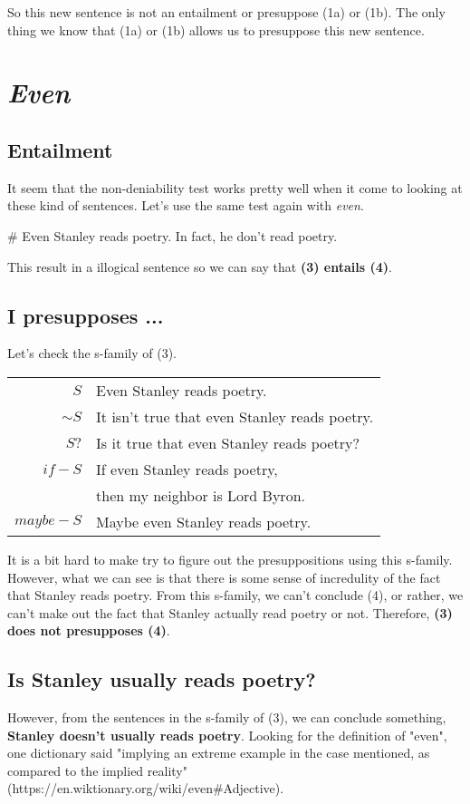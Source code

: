 \documentclass{article}
\begin{document}
So this new sentence is not an entailment or presuppose (1a) or (1b). The only thing we know that (1a) or (1b) allows us to presuppose this new sentence. 

\section{\textit{Even}}
\subsection{Entailment}
It seem that the non-deniability test works pretty well when it come to looking at these kind of sentences. Let's use the same test again with \textit{even}.

\# Even Stanley reads poetry. In fact, he don't read poetry. 

This result in a illogical sentence so we can say that \textbf{(3) entails (4)}. 

\subsection{I presupposes ...}
Let's check the s-family of (3). 

\begin{center}
\begin{tabular}{r|l}
    $S$         & Even Stanley reads poetry. \\
    $\sim S$    & It isn't true that even Stanley reads poetry. \\
    $S?$        & Is it true that even Stanley reads poetry? \\
    $if-S$      & If even Stanley reads poetry, \\
                & then my neighbor is Lord Byron. \\
    $maybe-S$   & Maybe even Stanley reads poetry. \\
\end{tabular}
\end{center}

It is a bit hard to make try to figure out the presuppositions using this s-family. However, what we can see is that there is some sense of incredulity of the fact that Stanley reads poetry. From this s-family, we can't conclude (4), or rather, we can't make out the fact that Stanley actually read poetry or not. Therefore, \textbf{(3) does not presupposes (4)}.

\subsection{Is Stanley usually reads poetry?}
However, from the sentences in the s-family of (3), we can conclude something, \textbf{Stanley doesn't usually reads poetry}. Looking for the definition of "even", one dictionary said "implying an extreme example in the case mentioned, as compared to the implied reality" (https://en.wiktionary.org/wiki/even\#Adjective).
\end{document}
